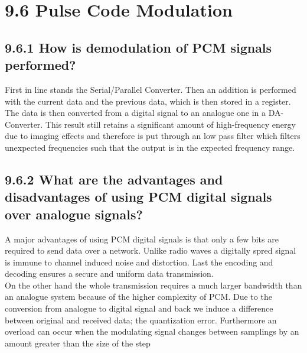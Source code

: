 \documentclass{article}
\begin{document}
	\section*{9.6 Pulse Code Modulation}
	\begin{adjustwidth}{2em}{2em}
		\subsection*{9.6.1 How is demodulation of PCM signals performed?}
		\begin{adjustwidth}{2em}{}
			First in line stands the Serial/Parallel Converter. Then an addition is performed with the current data and the previous data, which is then stored in a register. The data is then converted from a digital signal to an analogue one in a DA-Converter. This result still retains a significant amount of high-frequency energy due to imaging effects and therefore is put through an low pass filter which filters unexpected frequencies such that the output is in the expected frequency range.
		\end{adjustwidth}
		\newpage
		\subsection*{9.6.2 What are the advantages and disadvantages of using PCM digital signals over analogue signals?}
		\begin{adjustwidth}{2em}{}
			A major advantages of using PCM digital signals is that only a few bits are required to send data over a network. Unlike radio waves a digitally spred signal is immune to channel induced noise and distortion. Last the encoding and decoding ensures a secure and uniform data transmission. \\
			On the other hand the whole transmission requires a much larger bandwidth than an analogue system because of the higher complexity of PCM. Due to the conversion from analogue to digital signal and back we induce a difference between original and received data; the quantization error. Furthermore an overload can occur when the modulating signal changes between samplings by an amount greater than the size of the step
		\end{adjustwidth}
	\end{adjustwidth}
\end{document}
